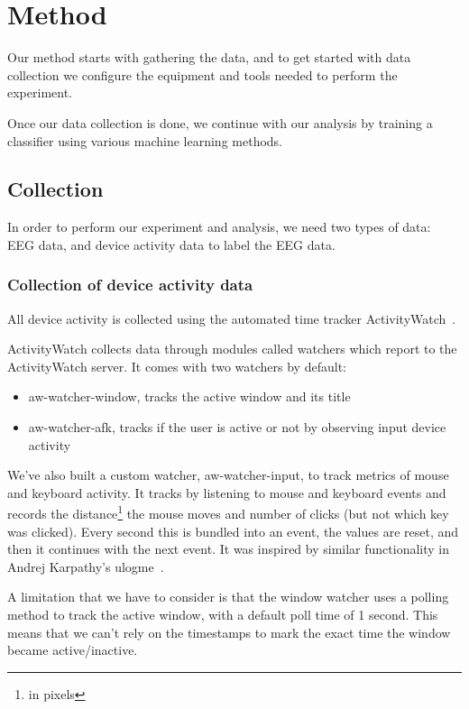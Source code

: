 \chapter{Method}

Our method starts with gathering the data, and to get started with data collection we configure the equipment and tools needed to perform the experiment.

Once our data collection is done, we continue with our analysis by training a classifier using various machine learning methods.

\section{Collection}

In order to perform our experiment and analysis, we need two types of data: EEG data, and device activity data to label the EEG data.

    \subsection{Collection of device activity data}

        All device activity is collected using the automated time tracker ActivityWatch~\cite{bjareholt_activitywatch_2020-1}.

        ActivityWatch collects data through modules called watchers which report to the ActivityWatch server. It comes with two watchers by default:

        \begin{itemize}
            \item aw-watcher-window, tracks the active window and its title
            \item aw-watcher-afk, tracks if the user is active or not by observing input device activity
        \end{itemize}

        We've also built a custom watcher, aw-watcher-input, to track metrics of mouse and keyboard activity. It tracks by listening to mouse and keyboard events and records the distance\footnote{in pixels} the mouse moves and number of clicks (but not which key was clicked). Every second this is bundled into an event, the values are reset, and then it continues with the next event. It was inspired by similar functionality in Andrej Karpathy's ulogme~\cite{karpathy_ulogme_2016}.

        A limitation that we have to consider is that the window watcher uses a polling method to track the active window, with a default poll time of 1 second. This means that we can't rely on the timestamps to mark the exact time the window became active/inactive.

